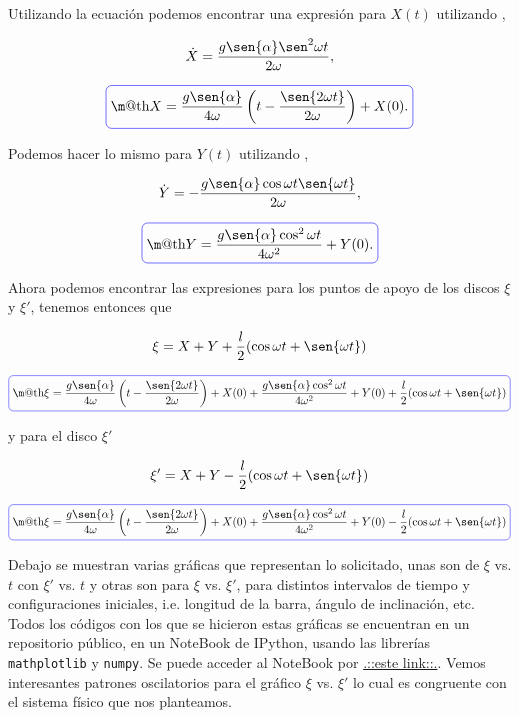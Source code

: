 \documentclass[a4paper,10pt]{article}
\makeatletter
\numberwithin{equation}{section}
\newcommand*{\boxcolor}{blue}
\renewcommand{\boxed}[1]{\textcolor{\boxcolor}{%
\tikz[baseline={([yshift=-1ex]current bounding box.center)}] \node [rectangle, minimum width=1ex,rounded corners,draw] {\normalcolor\m@th$\displaystyle#1$};}}
\makeatother
\begin{document}
Utilizando la ecuación  podemos encontrar una expresión para $X(t)$ utilizando  
,

\begin{equation}
 \dot{X} = \frac{g\sen{\alpha}\sen^2{\omega t}}{2\omega},
\end{equation}

\begin{equation}
 \boxed{X = \frac{g\sen{\alpha}}{4\omega}\left(t - \frac{\sen{2\omega t}}{2\omega}\right) + X(0) .}
\end{equation}

Podemos hacer lo mismo para $Y(t)$ utilizando ,

\begin{equation}
 \dot{Y} = - \frac{g\sen{\alpha}\cos{\omega t}\sen{\omega t}}{2\omega},
\end{equation}

\begin{equation}
 \boxed{Y = \frac{g\sen{\alpha}\cos^2{\omega t}}{4\omega^2} + Y(0).}
\end{equation}

Ahora podemos encontrar las expresiones para los puntos de apoyo de los discos 
$\xi$ y $\xi'$, tenemos entonces que 

\begin{equation}
 \xi = X + Y + \frac{l}{2}(\cos{\omega t} + \sen{\omega t})
\end{equation}

\begin{equation}
 \boxed{\xi = \frac{g\sen{\alpha}}{4\omega}\left(t - \frac{\sen{2\omega t}}{2\omega} \right) + X(0) 
 + \frac{g\sen{\alpha}\cos^2{\omega t}}{4\omega^2} + Y(0) + 
 \frac{l}{2}(\cos{\omega t} + \sen{\omega t})}
\end{equation}

y para el disco $\xi'$ 

\begin{equation}
  \xi' = X + Y - \frac{l}{2}(\cos{\omega t} + \sen{\omega t})
\end{equation}

\begin{equation}
 \boxed{\xi = \frac{g\sen{\alpha}}{4\omega}\left(t - \frac{\sen{2\omega t}}{2\omega} \right) + X(0) 
 + \frac{g\sen{\alpha}\cos^2{\omega t}}{4\omega^2} + Y(0) - 
 \frac{l}{2}(\cos{\omega t} + \sen{\omega t})}
\end{equation}

Debajo se muestran varias gráficas que representan lo solicitado, unas son de $\xi$ vs. $t$ con 
$\xi'$ vs. $t$ y otras son para $\xi$ vs. $\xi'$, para distintos intervalos de tiempo y 
configuraciones iniciales, i.e. longitud de la barra, ángulo de inclinación, etc. Todos 
los códigos con los que se hicieron estas gráficas se encuentran en un repositorio público,
en un NoteBook de IPython, usando las librerías \texttt{mathplotlib} y \texttt{numpy}. Se 
puede acceder al NoteBook por \href{https://github.com/FavioVazquez/MecanicaClasica-PCF/blob/master/Tarea7/Problema1.ipynb}{\color{blue}.::este link::.}.
Vemos interesantes patrones oscilatorios para el gráfico $\xi$ vs. $\xi'$ lo cual es 
congruente con el sistema físico que nos planteamos.
\end{document}
